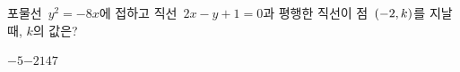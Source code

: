 포물선~$y^2=-8x$에 접하고 직선~$2x-y+1=0$과 평행한 직선이 점~$(-2{,}\mkern3mu\mathopen{}k)$를 지날 때, $k$의 값은?
\begin{choices32}{$-5$}{$-2$}{$1$}{$4$}{$7$}\end{choices32}
